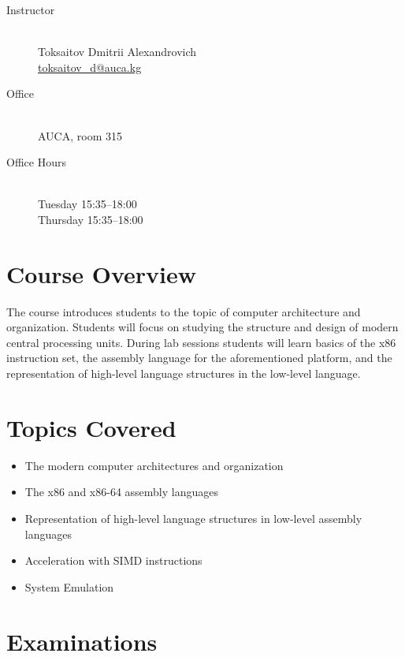 \documentclass[12pt,a4paper,oneside]{article}
\begin{document}
        \begin{description}
            \item[Instructor]\hfill\\
                Toksaitov Dmitrii Alexandrovich\\
                \href{mailto:toksaitov_d@auca.kg}{toksaitov\_d@auca.kg}
            \item[Office]\hfill\\
                AUCA, room 315
            \item[Office Hours]\hfill\\
                Tuesday 15:35--18:00\\
                Thursday 15:35--18:00
        \end{description}

    \section{Course Overview}

        The course introduces students to the topic of computer architecture and
        organization. Students will focus on studying the structure and design
        of modern central processing units. During lab sessions students will
        learn basics of the x86 instruction set, the assembly language for the
        aforementioned platform, and the representation of high-level language
        structures in the low-level language.

    \section{Topics Covered}

        \begin{itemize}
            \item The modern computer architectures and organization
            \item The x86 and x86-64 assembly languages
            \item Representation of high-level language structures in low-level
            assembly languages
            \item Acceleration with SIMD instructions
            \item System Emulation
        \end{itemize}

    \section{Examinations}
\end{document}
